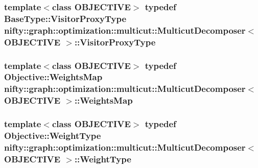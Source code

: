 \subsubsection[{Visitor\+Proxy\+Type}]{\setlength{\rightskip}{0pt plus 5cm}template$<$class O\+B\+J\+E\+C\+T\+I\+V\+E$>$ typedef {\bf Base\+Type\+::\+Visitor\+Proxy\+Type} {\bf nifty\+::graph\+::optimization\+::multicut\+::\+Multicut\+Decomposer}$<$ O\+B\+J\+E\+C\+T\+I\+V\+E $>$\+::{\bf Visitor\+Proxy\+Type}}\label{classnifty_1_1graph_1_1optimization_1_1multicut_1_1MulticutDecomposer_a53a9d7161f78a1857add8e82d05fbd70}
\hypertarget{classnifty_1_1graph_1_1optimization_1_1multicut_1_1MulticutDecomposer_a057405459f7f484d39c46c4a58fb34df}{}
\subsubsection[{Weights\+Map}]{\setlength{\rightskip}{0pt plus 5cm}template$<$class O\+B\+J\+E\+C\+T\+I\+V\+E$>$ typedef Objective\+::\+Weights\+Map {\bf nifty\+::graph\+::optimization\+::multicut\+::\+Multicut\+Decomposer}$<$ O\+B\+J\+E\+C\+T\+I\+V\+E $>$\+::{\bf Weights\+Map}}\label{classnifty_1_1graph_1_1optimization_1_1multicut_1_1MulticutDecomposer_a057405459f7f484d39c46c4a58fb34df}
\hypertarget{classnifty_1_1graph_1_1optimization_1_1multicut_1_1MulticutDecomposer_a53574e582133a64729724c47244450b1}{}
\subsubsection[{Weight\+Type}]{\setlength{\rightskip}{0pt plus 5cm}template$<$class O\+B\+J\+E\+C\+T\+I\+V\+E$>$ typedef Objective\+::\+Weight\+Type {\bf nifty\+::graph\+::optimization\+::multicut\+::\+Multicut\+Decomposer}$<$ O\+B\+J\+E\+C\+T\+I\+V\+E $>$\+::{\bf Weight\+Type}}\label{classnifty_1_1graph_1_1optimization_1_1multicut_1_1MulticutDecomposer_a53574e582133a64729724c47244450b1}


